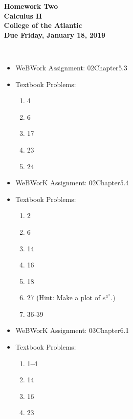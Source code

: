 \documentclass[12pt]{article}
\begin{document}
\pagestyle{empty}
 
\begin{center}
{\LARGE {\bf Homework Two}}\\
\bigskip
{\Large {\bf Calculus II}}\\
\bigskip
{\Large {\bf College of the Atlantic}}\\
\bigskip
{ {\bf Due Friday, January 18, 2019}}\\ 
\end{center}



 \\ 




\begin{itemize}
\item WeBWork Assignment: 02Chapter5.3

\item Textbook Problems:

\begin{enumerate}
\setlength{\itemsep}{-1mm}
  \item 4
  \item 6
  \item 17
  \item 23
  \item 24
\end{enumerate}

\end{itemize}



\begin{itemize}
  \item WeBWorK Assignment: 02Chapter5.4

  \item Textbook Problems:
\begin{enumerate}
\setlength{\itemsep}{-1mm}
  \item 2
  \item 6
  \item 14
  \item 16 
  \item 18
  \item 27 (Hint: Make a plot of $e^{x^2}$.)
  \item 36-39
\end{enumerate}
\end{itemize}


\begin{itemize}

\item WeBWorK Assignment: 03Chapter6.1

\item Textbook Problems:
  \begin{enumerate}
  \setlength{\itemsep}{-1mm}
    \item 1--4
    \item 14
    \item 16
    \item 23
  \end{enumerate}

\end{itemize}
\end{document}
